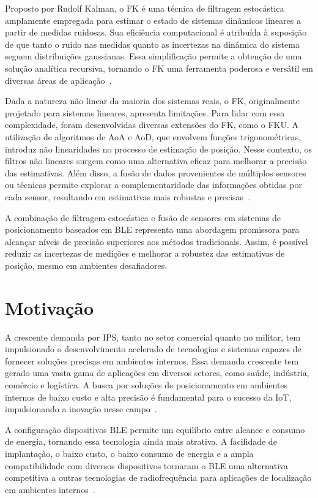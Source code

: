 Proposto por Rudolf Kalman, o FK é uma técnica de filtragem estocástica amplamente empregada para estimar o estado de sistemas dinâmicos lineares a partir de medidas ruidosas. Sua eficiência computacional é atribuída à suposição de que tanto o ruído nas medidas quanto as incertezas na dinâmica do sistema seguem distribuições gaussianas. Essa simplificação permite a obtenção de uma solução analítica recursiva, tornando o FK uma ferramenta poderosa e versátil em diversas áreas de aplicação~\cite{Kalman1960}.

Dada a natureza não linear da maioria dos sistemas reais, o FK, originalmente projetado para sistemas lineares, apresenta limitações. Para lidar com essa complexidade, foram desenvolvidas diversas extensões do FK, como o FKU. A utilização de algoritmos de AoA e AoD, que envolvem funções trigonométricas, introduz não linearidades no processo de estimação de posição. Nesse contexto, os filtros não lineares surgem como uma alternativa eficaz para melhorar a precisão das estimativas. Além disso, a fusão de dados provenientes de múltiplos sensores ou técnicas permite explorar a complementaridade das informações obtidas por cada sensor, resultando em estimativas mais robustas e precisas~\cite{Assa2015}.

A combinação de filtragem estocástica e fusão de sensores em sistemas de posicionamento baseados em BLE representa uma abordagem promissora para alcançar níveis de precisão superiores aos métodos tradicionais. Assim, é possível reduzir as incertezas de medições e melhorar a robustez das estimativas de posição, mesmo em ambientes desafiadores.

\section{Motivação}
\label{sec:motivacao}

A crescente demanda por IPS, tanto no setor comercial quanto no militar, tem impulsionado o desenvolvimento acelerado de tecnologias e sistemas capazes de fornecer soluções precisas em ambientes internos. Essa demanda crescente tem gerado uma vasta gama de aplicações em diversos setores, como saúde, indústria, comércio e logística. A busca por soluções de posicionamento em ambientes internos de baixo custo e alta precisão é fundamental para o sucesso da IoT, impulsionando a inovação nesse campo~\cite{Guo2020, Farahsari2022, Feng2020}.

A configuração dispositivos BLE permite um equilíbrio entre alcance e consumo de energia, tornando essa tecnologia ainda mais atrativa. A facilidade de implantação, o baixo custo, o baixo consumo de energia e a ampla compatibilidade com diversos dispositivos tornaram o BLE uma alternativa competitiva a outras tecnologias de radiofrequência para aplicações de localização em ambientes internos~\cite{Philips2023, Gouzouasis2012}.

